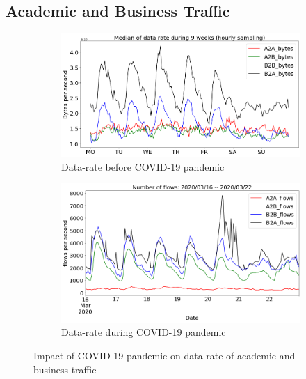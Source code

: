 \documentclass[10pt, journal, letterpaper]{IEEEtran}
\newcommand\linearFigSze{0.48}
\begin{document}
\subsection{Academic and Business Traffic}
\begin{figure}
    \begin{subfigure}{\linearFigSze\textwidth}
          \centering
          \includegraphics[width=\columnwidth]{img/BCO_acaBus_bps.png}
          \caption{Data-rate before COVID-19 pandemic}
          \label{fig:BCO_acaBus_bps}
    \end{subfigure}
    \begin{subfigure}{\linearFigSze\textwidth}
          \centering
          \includegraphics[width=\columnwidth]{img/CO2_acaBus_bps.png}
          \caption{Data-rate during COVID-19 pandemic}
          \label{fig:CO_acaBus_bps}
    \end{subfigure}
    \caption{Impact of COVID-19 pandemic on data rate of academic and business traffic}
    \label{fig:datarate_acaBus_BCO_CO}
\end{figure}
\end{document}
